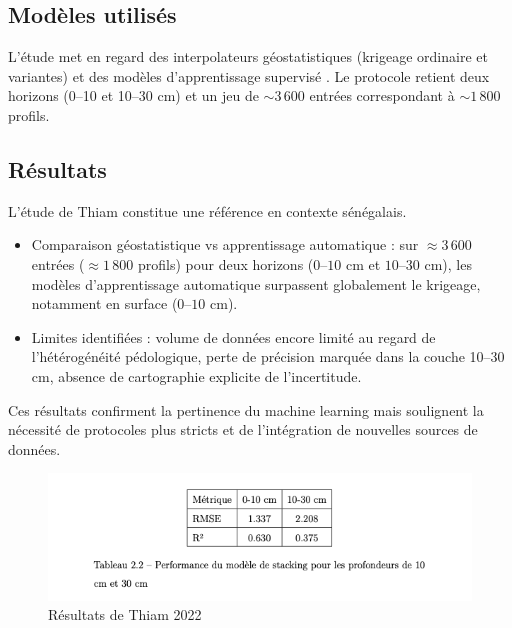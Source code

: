 \documentclass[12pt,a4paper,oneside]{report}
\begin{document}
\subsection{Modèles utilisés}
L’étude met en regard des interpolateurs géostatistiques (krigeage ordinaire et variantes) et  des modèles d’apprentissage supervisé . Le protocole retient deux horizons (0–10 et 10–30 cm) et un jeu de \(\sim 3\,600\) entrées correspondant à \(\sim 1\,800\) profils.
\subsection{Résultats}
L’étude de Thiam constitue une référence en contexte sénégalais.
\begin{itemize}
  \item Comparaison géostatistique vs apprentissage automatique : sur $\approx 3\,600$ entrées ($\approx 1\,800$ profils) pour deux horizons ($0$--$10$ cm et $10$--$30$ cm), les modèles d’apprentissage automatique surpassent globalement le krigeage, notamment en surface ($0$--$10$ cm).

\item Limites identifiées :  volume de données encore limité au regard de l’hétérogénéité pédologique,  perte de précision marquée dans la couche 10–30 cm,  absence de cartographie explicite de l’incertitude.
\end{itemize}
Ces résultats confirment la pertinence du machine learning mais soulignent la nécessité de protocoles plus stricts et de l’intégration de nouvelles sources de données.

\begin{figure}[h]
    \centering
    \includegraphics[width=0.9\linewidth]{images/stacking.png}
    \caption{Résultats de Thiam 2022 }
    \label{fig:thiam_results}
\end{figure}
\end{document}
